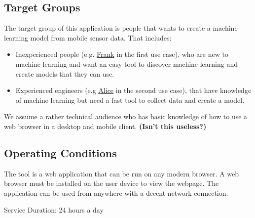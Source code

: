 \subsection{Target Groups}
The target group of this application is people that wants to create a machine learning model from mobile sensor data.
That includes:
\begin{itemize}
    \item Inexperienced people (e.g. \hyperref[ocfrank]{Frank} in the first use case), who are new to machine learning and want an easy tool to discover machine learning and create models that they can use.
    \item Experienced engineers (e.g \hyperref[ocalice]{Alice} in the second use case), that have knowledge of machine learning but need a fast tool to collect data and create a model.
\end{itemize}
We assume a rather technical audience who has basic knowledge of how to use a web browser in a desktop and mobile client. \textbf{(Isn't this useless?)}

\subsection{Operating Conditions}
The tool is a web application that can be run on any modern browser. A web browser must be installed on the user device to view the webpage. The application can be used from anywhere with a decent network connection.

Service Duration: 24 hours a day